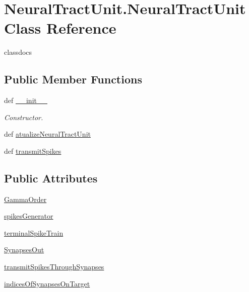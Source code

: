 \hypertarget{class_neural_tract_unit_1_1_neural_tract_unit}{\section{Neural\-Tract\-Unit.\-Neural\-Tract\-Unit Class Reference}
\label{class_neural_tract_unit_1_1_neural_tract_unit}
}


classdocs  


\subsection*{Public Member Functions}
\begin{DoxyCompactItemize}
\item 
def \hyperlink{class_neural_tract_unit_1_1_neural_tract_unit_a8b10daafc9b7e804ba7d1c62aa854fa6}{\-\_\-\-\_\-init\-\_\-\-\_\-}
\begin{DoxyCompactList}\small\item\em Constructor. \end{DoxyCompactList}\item 
def \hyperlink{class_neural_tract_unit_1_1_neural_tract_unit_aaa36d43c7f4d1664696922e731f9e14a}{atualize\-Neural\-Tract\-Unit}
\item 
def \hyperlink{class_neural_tract_unit_1_1_neural_tract_unit_a1c44e3b23ebda745d84d88c015c1cb25}{transmit\-Spikes}
\end{DoxyCompactItemize}
\subsection*{Public Attributes}
\begin{DoxyCompactItemize}
\item 
\hyperlink{class_neural_tract_unit_1_1_neural_tract_unit_aee01a134ce97127783d75757ec15f352}{Gamma\-Order}
\item 
\hyperlink{class_neural_tract_unit_1_1_neural_tract_unit_a57cbb130e004fb3f7ee8d8a540f7dff0}{spikes\-Generator}
\item 
\hyperlink{class_neural_tract_unit_1_1_neural_tract_unit_ac34c86235329e753e8cfdfcc1e24c53f}{terminal\-Spike\-Train}
\item 
\hyperlink{class_neural_tract_unit_1_1_neural_tract_unit_a740d2cfa17ad57c7dbd40fbafc654b95}{Synapses\-Out}
\item 
\hyperlink{class_neural_tract_unit_1_1_neural_tract_unit_ac6fa367f6ada8045919674feaed4f6ad}{transmit\-Spikes\-Through\-Synapses}
\item 
\hyperlink{class_neural_tract_unit_1_1_neural_tract_unit_a4e5fa20e16e924e7f27a087e8f7a19a7}{indices\-Of\-Synapses\-On\-Target}
\end{DoxyCompactItemize}


